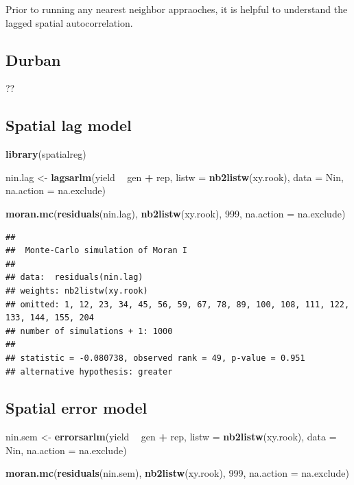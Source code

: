 \documentclass[]{book}
\newenvironment{Shaded}{\begin{snugshade}}{\end{snugshade}}
\newcommand{\DataTypeTok}[1]{\textcolor[rgb]{0.13,0.29,0.53}{#1}}
\newcommand{\DecValTok}[1]{\textcolor[rgb]{0.00,0.00,0.81}{#1}}
\newcommand{\KeywordTok}[1]{\textcolor[rgb]{0.13,0.29,0.53}{\textbf{#1}}}
\newcommand{\NormalTok}[1]{#1}
\newcommand{\OperatorTok}[1]{\textcolor[rgb]{0.81,0.36,0.00}{\textbf{#1}}}
\newcommand{\StringTok}[1]{\textcolor[rgb]{0.31,0.60,0.02}{#1}}
\begin{document}
Prior to running any nearest neighbor appraoches, it is helpful to understand the lagged spatial autocorrelation.

\hypertarget{durban}{%
\subsection{Durban}\label{durban}}

??

\hypertarget{spatial-lag-model}{%
\subsection{Spatial lag model}\label{spatial-lag-model}}

\begin{Shaded}
\begin{Highlighting}[]
\KeywordTok{library}\NormalTok{(spatialreg)}

\NormalTok{nin.lag <-}\StringTok{ }\KeywordTok{lagsarlm}\NormalTok{(yield }\OperatorTok{~}\StringTok{ }\NormalTok{gen }\OperatorTok{+}\StringTok{ }\NormalTok{rep,}
                       \DataTypeTok{listw =} \KeywordTok{nb2listw}\NormalTok{(xy.rook),}
                       \DataTypeTok{data =}\NormalTok{ Nin, }\DataTypeTok{na.action =}\NormalTok{ na.exclude)}

\KeywordTok{moran.mc}\NormalTok{(}\KeywordTok{residuals}\NormalTok{(nin.lag), }\KeywordTok{nb2listw}\NormalTok{(xy.rook), }\DecValTok{999}\NormalTok{, }\DataTypeTok{na.action =}\NormalTok{ na.exclude)}
\end{Highlighting}
\end{Shaded}

\begin{verbatim}
## 
##  Monte-Carlo simulation of Moran I
## 
## data:  residuals(nin.lag) 
## weights: nb2listw(xy.rook) 
## omitted: 1, 12, 23, 34, 45, 56, 59, 67, 78, 89, 100, 108, 111, 122, 133, 144, 155, 204 
## number of simulations + 1: 1000 
## 
## statistic = -0.080738, observed rank = 49, p-value = 0.951
## alternative hypothesis: greater
\end{verbatim}

\hypertarget{spatial-error-model}{%
\subsection{Spatial error model}\label{spatial-error-model}}

\begin{Shaded}
\begin{Highlighting}[]
\NormalTok{nin.sem <-}\StringTok{ }\KeywordTok{errorsarlm}\NormalTok{(yield }\OperatorTok{~}\StringTok{ }\NormalTok{gen }\OperatorTok{+}\StringTok{ }\NormalTok{rep,}
                       \DataTypeTok{listw =} \KeywordTok{nb2listw}\NormalTok{(xy.rook),}
                       \DataTypeTok{data =}\NormalTok{ Nin, }\DataTypeTok{na.action =}\NormalTok{ na.exclude)}

\KeywordTok{moran.mc}\NormalTok{(}\KeywordTok{residuals}\NormalTok{(nin.sem), }\KeywordTok{nb2listw}\NormalTok{(xy.rook), }\DecValTok{999}\NormalTok{, }\DataTypeTok{na.action =}\NormalTok{ na.exclude)}
\end{Highlighting}
\end{Shaded}
\end{document}
